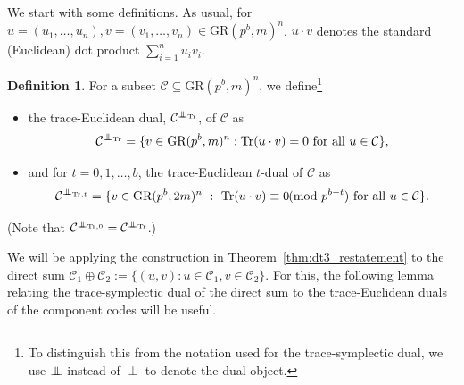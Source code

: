 \documentclass{article}
\DeclareMathOperator{\tr}{tr}
\DeclareMathOperator{\Tr}{Tr}
\newcommand\independent{\protect\mathpalette{\protect\independenT}{\perp}}
\def\independenT#1#2{\mathrel{\rlap{$#1#2$}\mkern3mu{#1#2}}}
\theoremstyle{remark}
\theoremstyle{definition}
\newtheorem{defin}{Definition}[section]
\numberwithin{equation}{section}
\begin{document}
We start with some definitions. As usual, for $u = (u_1,\ldots,u_n), v = (v_1,\ldots,v_n)\in \text{GR}(p^b,m)^n$, $u \cdot v$ denotes the standard (Euclidean) dot product $\sum_{i=1}^nu_iv_i$. 
\begin{defin} For a subset $\mathcal{C} \subseteq \text{GR}(p^b,m)^{n}$, we define\footnote{To distinguish this from the notation used for the trace-symplectic dual, we use $\independent$ instead of $\perp$ to denote the dual object.}
\begin{itemize}
\item the trace-Euclidean dual, $\mathcal{C}^{\independent_{\Tr}}$, of $\mathcal{C}$ as
$$\mathcal{C}^{\independent_{\Tr}}=\{ v \in \text{GR}(p^b,m)^{n}  : \Tr(u \cdot v) = 0 \text{~for all~}  u \in \mathcal{C}\},$$
\item and for $t = 0,1,\ldots,b$, the trace-Euclidean $t$-dual of $\mathcal{C}$ as 
$$\mathcal{C}^{\independent_{\Tr,t}} = \{v  \in \text{GR}(p^b,2m)^{n} ~:~ \Tr(u \cdot v) \equiv 0 \!\!\!   \pmod{p^{b-t}} \text{~for all~}  u \in \mathcal{C}\}.$$
\end{itemize}
(Note that $\mathcal{C}^{\independent_{\Tr,0}} = \mathcal{C}^{\independent_{\Tr}}$.)
\end{defin}



We will be applying the construction in Theorem~\ref{thm:dt3_restatement} to the direct sum $\mathcal{C}_1 \oplus \mathcal{C}_2 := \{(u,v): u \in \mathcal{C}_1, v \in \mathcal{C}_2\}$. For this, the following lemma relating the trace-symplectic dual of the direct sum to the trace-Euclidean duals of the component codes will be useful.
\end{document}
